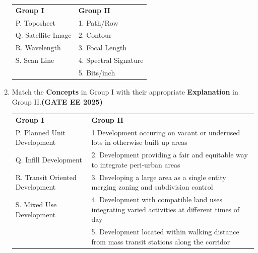 \documentclass[journal,12pt,onecolumn]{IEEEtran}
\theoremstyle{remark}
\begin{document}
\begin{enumerate}
\begin{tabular}{p{}p{}}
\textbf{Group I}  & \textbf{Group II}\\
P. Toposheet     & 1. Path/Row \\
Q. Satellite Image     & 2. Contour\\
R. Wavelength   & 3. Focal Length\\
S. Scan Line   & 4. Spectral Signature\\
            & 5. Bits/inch\\
\end{tabular}
\begin{enumerate}
\end{enumerate}
\item Match the \textbf{Concepts} in Group I with their appropriate \textbf{Explanation} in Group II.\hfill \textbf{(GATE EE 2025)}\\
\begin{tabular}{p{}p{}}
\textbf{Group I}  & \textbf{Group II}\\
P. Planned Unit Development     & 1.Development occuring on vacant or underused lots in otherwise built up areas \\
Q. Infill Development     & 2. Development providing a fair and equitable way to integrate peri-urban areas\\
R. Transit Oriented Development  & 3. Developing a large area as a single entity merging zoning and subdivision control\\
S. Mixed Use Development & 4. Development with compatible land uses integrating varied activities at different times of day\\
     & 5. Development located within walking distance from mass transit stations along the corridor\\
\end{tabular}
\begin{enumerate}
\end{enumerate}
\end{enumerate}
\end{document}
